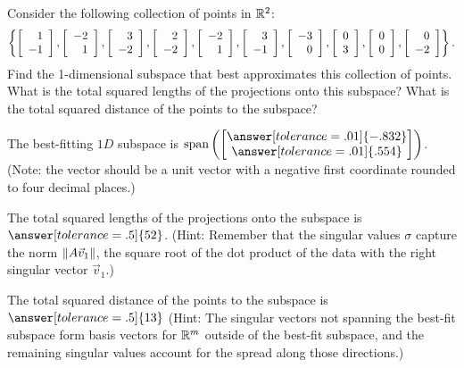 \documentclass{ximera}
\author{Zack Reed}
\begin{document}
\begin{problem}
  Consider the following collection of points in $\R^2$:
  \begin{equation*}
    \set{
      \startmat{r} 1 \\ -1 \stopmat,
      \startmat{r} -2 \\ 1 \stopmat,
      \startmat{r} 3 \\ -2 \stopmat,
      \startmat{r} 2 \\ -2 \stopmat,
      \startmat{r} -2 \\ 1 \stopmat,
      \startmat{r} 3 \\ -1 \stopmat,
      \startmat{r} -3 \\ 0 \stopmat,
      \startmat{r} 0 \\ 3 \stopmat,
      \startmat{r} 0 \\ 0 \stopmat,
      \startmat{r} 0 \\ -2 \stopmat
    }.
  \end{equation*}
  Find the 1-dimensional subspace that best approximates this
  collection of points. What is the total squared lengths of the projections onto this subspace? What is the total squared distance of the
  points to the subspace? 

  \begin{solution}
  
    The best-fitting $1D$ subspace is $\text{span}\left(\begin{bmatrix}
      \answer[tolerance=.01]{-.832}\\\answer[tolerance=.01]{.554}
    \end{bmatrix}\right)$. (Note: the vector should be a unit vector with a negative first coordinate rounded to four decimal places.)

    The total squared lengths of the projections onto the subspace is $\answer[tolerance=.5]{52}$. (Hint: Remember that the singular values $\sigma$ capture the norm $\norm{A\vec{v}_1}$, the square root of the dot product of the data with the right singular vector $\vec{v}_1$.)

    The total squared distance of the points to the subspace is $\answer[tolerance=.5]{13}$ (Hint: The singular vectors not spanning the best-fit subspace form basis vectors for $\RR^m$ outside of the best-fit subspace, and the remaining singular values account for the spread along those directions.)

  \end{solution}


\end{problem}
\end{document}
